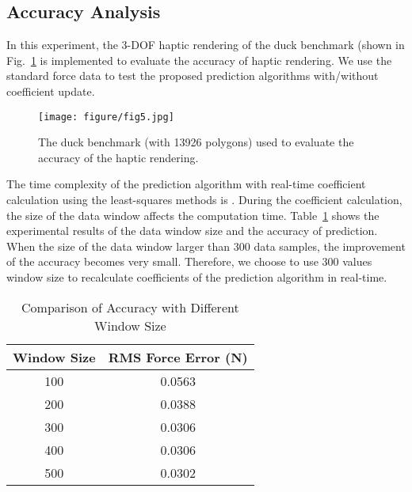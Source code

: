 \documentclass[10pt,journal,cspaper,compsoc]{IEEEtran}
\begin{document}
\subsection{Accuracy Analysis}
In this experiment, the 3-DOF haptic rendering of the duck benchmark (shown in Fig.~\ref{fig:duck} is implemented to evaluate the accuracy of haptic rendering. We use the standard force data \cite{no24} to test the proposed prediction algorithms with/without coefficient update. 

\begin{figure}[!t]
		\centering
		\texttt{[image: figure/fig5.jpg]}
		\caption{The duck benchmark (with 13926 polygons) used to evaluate the accuracy of the haptic rendering. }
		\label{fig:duck}
\end{figure}

The time complexity of the prediction algorithm with real-time coefficient calculation using the least-squares methods is . During the coefficient calculation, the size of the data window affects the computation time. Table~\ref{table:1} shows the experimental results of the data window size and the accuracy of prediction. When the size of the data window larger than 300 data samples, the improvement of the accuracy becomes very small. Therefore, we choose to use 300 values window size to recalculate coefficients of the prediction algorithm in real-time.
\begin{table}
\caption{Comparison of Accuracy with Different Window Size}
\begin{center}
	\begin{tabular}[c]{ c | c }
		\hline
		 Window Size & RMS Force Error (N) \\ \hline
		 100&	0.0563\\
		 200&	0.0388\\
		 300&	0.0306\\
		 400&	0.0306\\
		 500&	0.0302\\
		\hline
	\end{tabular}
	\label{table:1}
\end{center}
\end{table}
\end{document}
